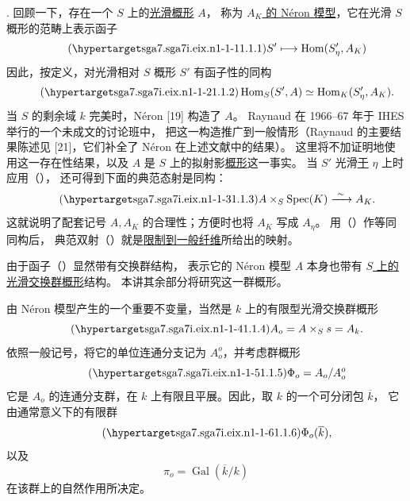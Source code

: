 \medskip
\noindent
{}. 回顾一下，存在一个 $S$ 上的\underline{光滑概形} $A$，
称为 \underline{$A_K$ 的 N\'eron 模型}，它在光滑 $S$ 概形的范畴上表示函子
\begin{equation}\tag{\SGARefTarget{sga7.sga7i.eix.n1-1-1}{1.1.1}}
 S'\longmapsto\operatorname{Hom}(S'_\eta,A_K)
\end{equation}
因此，按定义，对光滑相对 $S$ 概形 $S'$ 有函子性的同构
\begin{equation}\tag{\SGARefTarget{sga7.sga7i.eix.n1-1-2}{1.1.2}}
 \operatorname{Hom}_S(S',A)\simeq
 \operatorname{Hom}_K(S'_\eta,A_K).
\end{equation}
当 $S$ 的剩余域 $k$ 完美时，N\'eron [19] 构造了 $A$。
Raynaud 在 1966--67 年于 IHES 举行的一个未成文的讨论班中，
把这一构造推广到一般情形（Raynaud 的主要结果陈述见 [21]，它们补全了 N\'eron 在上述文献中的结果）。
这里将不加证明地使用这一存在性结果，以及 $A$ 是 $S$ 上的拟射影\underline{概形}这一事实。
当 $S'$ 光滑\underline{于} $\eta$ 上时应用（），
还可得到下面的典范态射是同构：
\begin{equation}\tag{\SGARefTarget{sga7.sga7i.eix.n1-1-3}{1.1.3}}
 A\times_S\operatorname{Spec}(K)\xrightarrow{\ \sim\ }A_K.
\end{equation}
这就说明了配套记号 $A,A_K$ 的合理性；方便时也将 $A_K$ 写成 $A_\eta$。
用（）作等同同构后，
典范双射（）就是\underline{限制到一般纤维}所给出的映射。

由于函子（）显然带有交换群结构，
表示它的 N\'eron 模型 $A$ 本身也带有 \underline{$S$ 上的光滑交换群概形}结构。
本讲其余部分将研究这一群概形。

由 N\'eron 模型产生的一个重要不变量，当然是 $k$ 上的有限型光滑交换群概形
\begin{equation}\tag{\SGARefTarget{sga7.sga7i.eix.n1-1-4}{1.1.4}}
 A_o=A\times_Ss=A_k.
\end{equation}
依照一般记号，将它的单位连通分支记为 $A_o^o$，并考虑群概形
\begin{equation}\tag{\SGARefTarget{sga7.sga7i.eix.n1-1-5}{1.1.5}}
 \Phi_o=A_o/A_o^o
\end{equation}
它是 $A_o$ 的连通分支群，在 $k$ 上有限且平展。因此，取 $k$ 的一个可分闭包 $\overline k$，
它由通常意义下的有限群
\begin{equation}\tag{\SGARefTarget{sga7.sga7i.eix.n1-1-6}{1.1.6}}
 \Phi_o(\overline k),
\end{equation}
以及
\[
 \pi_o=\operatorname{Gal}(\overline k/k)
\]
在该群上的自然作用所决定。

